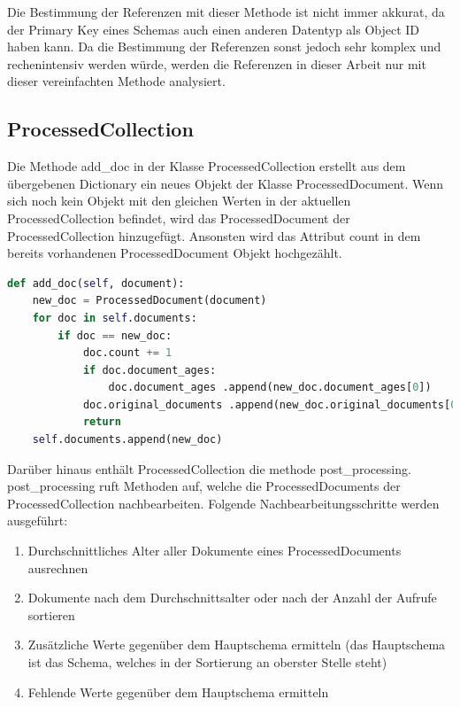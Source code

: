 Die Bestimmung der Referenzen mit dieser Methode ist nicht immer akkurat, da der Primary Key eines Schemas auch einen anderen Datentyp als Object ID haben kann.
Da die Bestimmung der Referenzen sonst jedoch sehr komplex und rechenintensiv werden würde, werden die Referenzen in dieser Arbeit nur mit dieser vereinfachten Methode analysiert.

\subsection{ProcessedCollection}
\label{sub:ba_processed_collection}

Die Methode add\_doc in der Klasse ProcessedCollection erstellt aus dem übergebenen Dictionary ein neues Objekt der Klasse ProcessedDocument.
Wenn sich noch kein Objekt mit den gleichen Werten in der aktuellen ProcessedCollection befindet, wird das ProcessedDocument der ProcessedCollection hinzugefügt.
Ansonsten wird das Attribut count in dem bereits vorhandenen ProcessedDocument Objekt hochgezählt.


\begin{lstlisting}[language=python, caption={ProcessedCollection.add\_doc},label={lst:backend_add_doc}]
def add_doc(self, document):
    new_doc = ProcessedDocument(document)
    for doc in self.documents:
        if doc == new_doc:
            doc.count += 1
            if doc.document_ages:
                doc.document_ages .append(new_doc.document_ages[0])
            doc.original_documents .append(new_doc.original_documents[0])
            return
    self.documents.append(new_doc)
\end{lstlisting}

Darüber hinaus enthält ProcessedCollection die methode post\_processing.
post\_processing ruft Methoden auf, welche die ProcessedDocuments der ProcessedCollection nachbearbeiten.
Folgende Nachbearbeitungsschritte werden ausgeführt:
\begin{enumerate}
    \item Durchschnittliches Alter aller Dokumente eines ProcessedDocuments ausrechnen
    \item Dokumente nach dem Durchschnittsalter oder nach der Anzahl der Aufrufe sortieren
    \item Zusätzliche Werte gegenüber dem Hauptschema ermitteln (das Hauptschema ist das Schema, welches in der Sortierung an oberster Stelle steht)
    \item Fehlende Werte gegenüber dem Hauptschema ermitteln
\end{enumerate}

